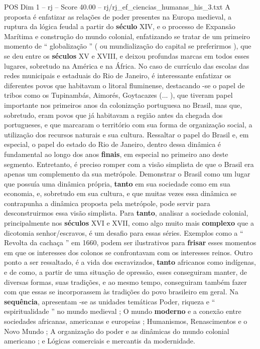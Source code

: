 \begin{textsample}{POS Dim 1 – rj – Score 40.00 – rj/rj\_ef\_ciencias\_humanas\_his\_3.txt}
A proposta é enfatizar as relações de poder presentes na Europa medieval, a ruptura da lógica feudal a partir do \textbf{século} XIV, e o processo de Expansão Marítima e construção do mundo colonial, enfatizando se tratar de um primeiro momento de “ globalização ” ( ou mundialização do capital se preferirmos ), que se deu entre os \textbf{séculos} XV e XVIII, e deixou profundas marcas em todos esses lugares, sobretudo na América e na África.
No caso de currículo das escolas das redes municipais e estaduais do Rio de Janeiro, é interessante enfatizar os diferentes povos que habitavam o litoral fluminense, destacando -se o papel de tribos como os Tupinambás, Aimorés, Goytacazes (... ), que tiveram papel importante nos primeiros anos da colonização portuguesa no Brasil, mas que, sobretudo, eram povos que já habitavam a região antes da chegada dos portugueses, e que marcaram o território com sua forma de organização social, a utilização dos recursos naturais e sua cultura.
Ressaltar o papel do Brasil e, em especial, o papel do estado do Rio de Janeiro, dentro dessa dinâmica é fundamental ao longo dos anos \textbf{finais}, em especial no primeiro ano deste segmento.
Entretanto, é preciso romper com a visão simplista de que o Brasil era apenas um complemento da sua metrópole.
Demonstrar o Brasil como um lugar que possuía uma dinâmica própria, \textbf{tanto} em sua sociedade como em sua economia, e, sobretudo em sua cultura, e que muitas vezes essa dinâmica se contrapunha a dinâmica proposta pela metrópole, pode servir para desconstruirmos essa visão simplista.
Para \textbf{tanto}, analisar a sociedade colonial, principalmente nos \textbf{séculos} XVI e XVII, como algo muito mais \textbf{complexo} que a dicotomia senhor/escravos, é um desafio para essas séries.
Exemplos como a “ Revolta da cachaça ” em 1660, podem ser ilustrativos para \textbf{frisar} esses momentos em que os interesses dos colonos se confrontavam com os interesses reinos.
Outro ponto a ser ressaltado, é a vida dos escravizados, \textbf{tanto} africanos como indígenas, e de como, a partir de uma situação de opressão, esses conseguiram manter, de diversas formas, suas tradições, e ao mesmo tempo, conseguiram também fazer com que essas se incorporassem às tradições do povo brasileiro em geral.
Na \textbf{sequência}, apresentam -se as unidades temáticas Poder, riqueza e “ espiritualidade ” no mundo medieval ; O mundo \textbf{moderno} e a conexão entre sociedades africanas, americanas e europeias ; Humanismos, Renascimentos e o Novo Mundo ; A organização do poder e as dinâmicas do mundo colonial americano ; e Lógicas comerciais e mercantis da modernidade.

\end{textsample}
